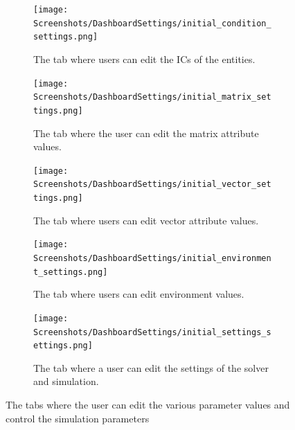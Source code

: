 \begin{figure}[h!]
    \centering
    \begin{subfigure}{0.49\linewidth}
        \centering
        \captionsetup{width=1\linewidth}
        \texttt{[image: Screenshots/DashboardSettings/initial\_condition\_settings.png]}
        \caption{
            The tab where users can edit the ICs of the entities.
        }
        \label{fig:ss:ds:initial_condition}
    \end{subfigure}
    \hfill
    \begin{subfigure}{0.49\linewidth}
        \centering
        \captionsetup{width=1\linewidth}
        \texttt{[image: Screenshots/DashboardSettings/initial\_matrix\_settings.png]}
        \caption{
            The tab where the user can edit the matrix attribute values. 
        }
        \label{fig:ss:ds:matrix}
    \end{subfigure}
    \hfill
    \begin{subfigure}{0.49\linewidth}
        \centering
        \captionsetup{width=1\linewidth}
        \texttt{[image: Screenshots/DashboardSettings/initial\_vector\_settings.png]}
        \caption{
            The tab where users can edit vector attribute values.
        }
        \label{fig:ss:ds:vector}
    \end{subfigure}
    \hfill
    \begin{subfigure}{0.49\linewidth}
        \centering
        \captionsetup{width=1\linewidth}
        \texttt{[image: Screenshots/DashboardSettings/initial\_environment\_settings.png]}
        \caption{
            The tab where users can edit environment values. 
        }
        \label{fig:ss:ds:environment}
    \end{subfigure}
    \hfill
    \begin{subfigure}{0.49\linewidth}
        \centering
        \captionsetup{width=1\linewidth}
        \texttt{[image: Screenshots/DashboardSettings/initial\_settings\_settings.png]}
        \caption{
            The tab where a user can edit the settings of the solver and simulation. 
        }
        \label{fig:ss:ds:settings}
    \end{subfigure}
    \caption{The tabs where the user can edit the various parameter values and control the simulation parameters}
 \end{figure}


